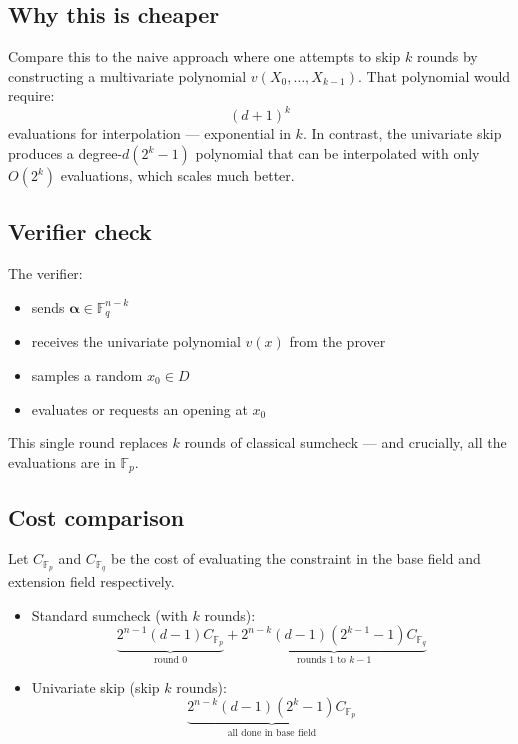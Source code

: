 \documentclass{article}
\newcommand{\Fp}{\mathbb F_p}
\newcommand{\Fq}{\mathbb F_q}
\begin{document}
\subsection{Why this is cheaper}

Compare this to the naive approach where one attempts to skip $k$ rounds by constructing a multivariate polynomial $v(X_0, \dots, X_{k-1})$. That polynomial would require:
\begin{equation}
(d + 1)^k
\end{equation}
evaluations for interpolation — exponential in $k$. In contrast, the univariate skip produces a degree-$d(2^k - 1)$ polynomial that can be interpolated with only $O(2^k)$ evaluations, which scales much better.

\subsection{Verifier check}

The verifier:
\begin{itemize}
    \item sends $\boldsymbol{\alpha} \in \Fq^{n-k}$
    \item receives the univariate polynomial $v(x)$ from the prover
    \item samples a random $x_0 \in D$
    \item evaluates or requests an opening at $x_0$
\end{itemize}

This single round replaces $k$ rounds of classical sumcheck — and crucially, all the evaluations are in $\Fp$.

\subsection{Cost comparison}

Let $C_{\Fp}$ and $C_{\Fq}$ be the cost of evaluating the constraint in the base field and extension field respectively.

\begin{itemize}
    \item Standard sumcheck (with $k$ rounds):
    \begin{equation}
    \underbrace{2^{n - 1}(d - 1) C_{\Fp}}_{\text{round 0}} + \underbrace{2^{n - k}(d - 1)(2^{k - 1} - 1) C_{\Fq}}_{\text{rounds 1 to } k-1}
    \end{equation}

    \item Univariate skip (skip $k$ rounds):
    \begin{equation}
    \underbrace{2^{n - k}(d - 1)(2^k - 1) C_{\Fp}}_{\text{all done in base field}}
    \end{equation}
\end{itemize}
\end{document}

